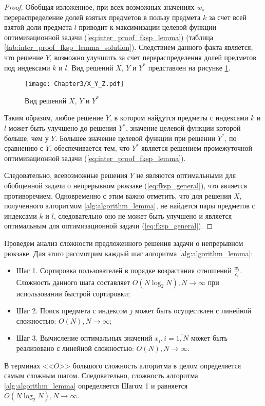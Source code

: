 \begin{proof}
Обобщая изложенное, при всех возможных значениях $w_s$ перераспределение долей взятых предметов в пользу предмета $k$ за счет всей взятой доли предмета $l$ приводит к максимизации целевой функции оптимизационной задачи (\ref{eq:inter_proof_fksp_lemma}) (таблица \ref{tab:inter_proof_fksp_lemma_solution}). Следствием данного факта является, что решение $Y$, возможно улучшить за счет перераспределения долей предметов под индексами $k$ и $l$. Вид решений $X$, $Y$ и $Y^{*}$ представлен на рисунке \ref{fig:X_Y_Ys_Solutions}.

\begin{figure}[htbp]
\begin{center}
\texttt{[image: Chapter3/X\_Y\_Z.pdf]}
\caption{Вид решений $X$, $Y$ и $Y^{*}$}
\label{fig:X_Y_Ys_Solutions}
\end{center}
\end{figure}

Таким образом, любое решение $Y$, в котором найдутся предметы с индексами $k$ и $l$ может быть улучшено до решения $Y^{*}$, значение целевой функции которой больше, чем у $Y$. Большее значение целевой функции при решении $Y^{*}$, по сравнению с $Y$, обеспечивается тем, что $Y^{*}$ является решением промежуточной оптимизационной задачи (\ref{eq:inter_proof_fksp_lemma}).

Следовательно, всевозможные решения $Y$ не являются оптимальными для обобщенной задачи о непрерывном рюкзаке (\ref{eq:fksp_general}), что является противоречием. Одновременно с этим важно отметить, что для решения $X$, полученного алгоритмом \ref{alg:algorithm_lemma}, не найдется пары предметов с индексами $k$ и $l$, следовательно оно не может быть улучшено и является оптимальным для оптимизационной задачи (\ref{eq:fksp_general}).
\end{proof}

Проведем анализ сложности предложенного решения задачи о непрерывном рюкзаке. Для этого рассмотрим каждый шаг алгоритма \ref{alg:algorithm_lemma}:
\begin{itemize}
	\item Шаг 1. Сортировка пользователей в порядке возрастания отношений $\frac{w_i}{c_i}$. Сложность данного шага составляет $O(N \log_2 N), N\to\infty$ при использовании быстрой сортировки;
	\item Шаг 2. Поиск предмета с индексом $j$ может быть осуществлен с линейной сложностью: $O(N), N\to\infty$;
	\item Шаг 3. Вычисление оптимальных значений $x_i, i=\overline{1,N}$ может быть реализовано с линейной сложностью: $O(N), N\to\infty$.
\end{itemize}
В терминах <<$O$>> большого сложность алгоритма в целом определяется самым сложным шагом. Следовательно, сложность алгоритма \ref{alg:algorithm_lemma} определяется Шагом 1 и равняется $O(N \log_2 N), N\to\infty$.

